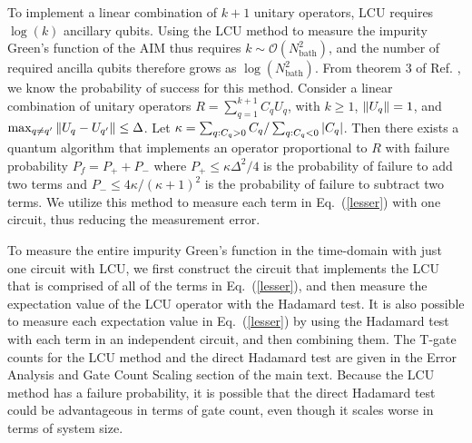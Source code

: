 \documentclass[aip,reprint,table,xcdraw,usenames,dvipsnames]{revtex4-1}
\begin{document}
To implement a linear combination of $k+1$ unitary operators, LCU requires $\log(k)$ ancillary qubits. Using the LCU method to measure the impurity Green's function of the AIM thus requires  $k\sim\mathcal{O}(N_{\text{bath}}^2)$, and  the number of required ancilla qubits therefore grows as  $\log(N_{\text{bath}}^2)$. From theorem 3 of Ref. , we know the probability of success for this method. Consider a linear combination of unitary
operators $R = \sum\limits_{q=1}^{k+1} C_q U_q$, with $k\geq1$, $\norm{U_q} = 1$, and $\max_{q \neq q^\prime} 
\norm{U_q - U_{q^\prime}} \leq \Delta$. Let $\kappa = \sum_{q:C_q>0}C_q / \sum_{q:C_q<0} \abs{C_q}$. Then there exists a quantum algorithm that implements an operator proportional to $R$ with failure probability $P_f = P_+ + P_-$ where  
$P_+ \leq {\kappa \Delta^2}/{4}$ is the probability of failure to add two terms and 
$P_- \leq {4\kappa}/{(\kappa+1)^2}$ is the probability of
failure to subtract two terms. 
We utilize this method to measure each term in Eq.~(\ref{lesser}) with one circuit, thus reducing the measurement error.

To measure the entire impurity Green's function in the time-domain with just one circuit with LCU, we first construct the circuit that implements the LCU that is comprised of all of the terms in Eq.~(\ref{lesser}), and then measure the expectation value of the LCU operator with the Hadamard test. It is also possible to measure each expectation value in Eq.~(\ref{lesser}) by using the Hadamard test with each term in an independent circuit, and then combining them. The T-gate counts for the LCU method and the direct Hadamard test are given in the Error Analysis and Gate Count Scaling section of the main text. Because the LCU method has a failure probability, it is possible that the direct Hadamard test could be advantageous in terms of gate count, even though it scales worse in terms of system size.\\



\end{document}
